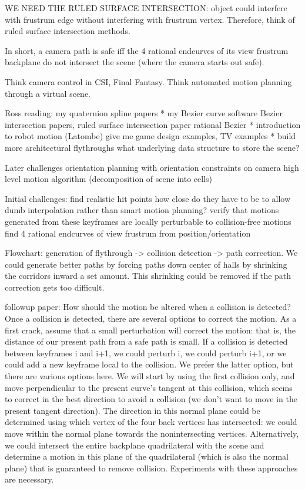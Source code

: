 \documentclass[11pt]{article}
\begin{document}
{WE NEED THE RULED SURFACE INTERSECTION: object could interfere with frustrum edge without
interfering with frustrum vertex.
Therefore, think of ruled surface intersection methods.

In short, a camera path is safe iff the 4 rational endcurves of its view frustrum
backplane do not intersect the scene (where the camera starts out safe).

Think camera control in CSI, Final Fantasy.
Think automated motion planning through a virtual scene.

Ross reading:
       my quaternion spline papers
       * my Bezier curve software
       Bezier intersection papers, ruled surface intersection paper
       rational Bezier
       * introduction to robot motion (Latombe)
       give me game design examples, TV examples
       * build more architectural flythroughs
       what underlying data structure to store the scene?

Later challenges
       orientation planning with orientation constraints on camera
       high level motion algorithm (decomposition of scene into cells)

Initial challenges: 
            find realistic hit points 
                how close do they have to be to allow dumb interpolation rather than
		smart motion planning?
	    verify that motions generated from these keyframes are locally perturbable
	       to collision-free motions
            find 4 rational endcurves of view frustrum from position/orientation 

Flowchart: generation of flythrough -> collision detection -> path correction.
We could generate better paths by forcing paths down center of halls by shrinking
the corridors inward a set amount.  This shrinking could be removed if the path
correction gets too difficult.

followup paper:
How should the motion be altered when a collision is detected?
Once a collision is detected, there are several options to correct the motion.
As a first crack, assume that a small perturbation will correct the motion:
that is, the distance of our present path from a safe path is small.
If a collision is detected between keyframes i and i+1, we could perturb i,
we could perturb i+1, or we could add a new keyframe local to the collision.
We prefer the latter option, but there are various options here.
We will start by using the first collision only, and move perpendicular to the
present curve's tangent at this collision, which seems to correct in the best
direction to avoid a collision (we don't want to move in the present tangent direction).
The direction in this normal plane could be determined using which vertex of the four
back vertices has intersected: we could move within the normal plane 
towards the nonintersecting vertices.  
Alternatively, we could intersect the entire backplane quadrilateral with the scene
and determine a motion in this plane of the quadrilateral (which is also the normal plane)
that is guaranteed to remove collision.
Experiments with these approaches are necessary.

}
\end{document}
